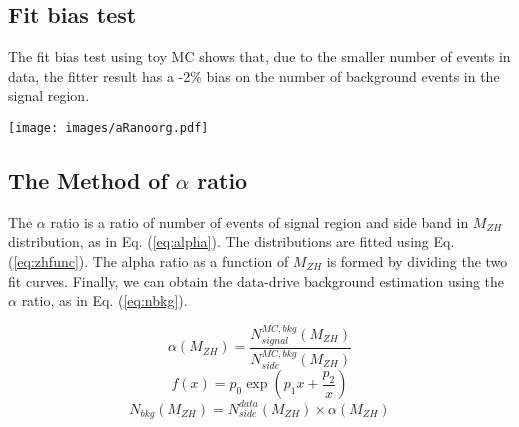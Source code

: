 \documentclass[a0,portrait]{a0poster}
\begin{document}
\begin{center}
\begin{multicols}{3}
    \begin{textbox}
      \section*{\color{FireBrick} Fit bias test}
      
      The fit bias test using toy MC shows that, due to the smaller number of events in data, the fitter result has a -2\% bias on the number of background events in the signal region.

      \begin{center}
        \texttt{[image: images/aRanoorg.pdf]}
        \label{fig:bias}
      \end{center}
      
    \end{textbox}
    
  \end{multicols}

  \vspace{-1.25em}

  \begin{multicols}{2}
    
    \begin{textbox2}
      \section*{\color{FireBrick} The Method of $\alpha$ ratio}

      The $\alpha$ ratio is a ratio of number of events of signal region and side band in $M_{ZH}$ distribution, as in Eq. (\ref{eq:alpha}). The distributions are fitted using Eq. (\ref{eq:zhfunc}). The alpha ratio as a function of $M_{ZH}$ is formed by dividing the two fit curves. Finally, we can obtain the data-drive background estimation using the $\alpha$ ratio, as in Eq. (\ref{eq:nbkg}).

      \begin{equation} \label{eq:alpha}
        \alpha(M_{ZH}) = \frac{N^{MC,bkg}_{signal}(M_{ZH})}{N^{MC,bkg}_{side}(M_{ZH})}
      \end{equation}
      \begin{equation} \label{eq:zhfunc}
        f(x) = p_0\exp(p_1x+\frac{p_2}{x})
      \end{equation}
      \begin{equation} \label{eq:nbkg}
        N_{bkg}(M_{ZH}) = N^{data}_{side}(M_{ZH})\times \alpha(M_{ZH})
      \end{equation}


\end{textbox2}
\end{multicols}
\end{center}
\end{document}
